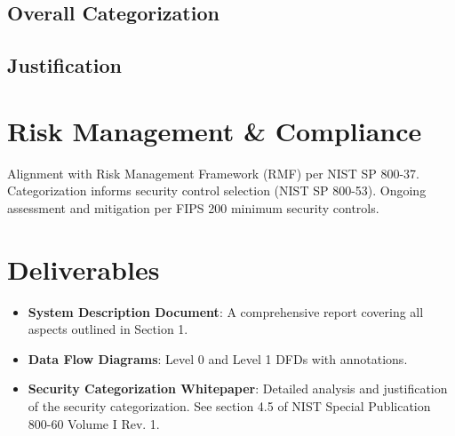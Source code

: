 \documentclass{article}
\begin{document}
\subsection{Overall Categorization}

\subsection{Justification}

\section{Risk Management \& Compliance}

Alignment with Risk Management Framework (RMF) per NIST SP 800-37. Categorization informs security control selection (NIST SP 800-53). Ongoing assessment and mitigation per FIPS 200 minimum security controls.

\section{Deliverables}

\begin{itemize}
    \item \textbf{System Description Document}: A comprehensive report covering all aspects outlined in Section 1.
    \item \textbf{Data Flow Diagrams}: Level 0 and Level 1 DFDs with annotations.
    \item \textbf{Security Categorization Whitepaper}: Detailed analysis and justification of the security categorization. See section 4.5 of NIST Special Publication 800-60 Volume I Rev. 1.
\end{itemize}
\end{document}

